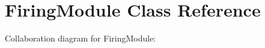 \hypertarget{class_firing_module}{}\section{Firing\+Module Class Reference}
\label{class_firing_module}


Collaboration diagram for Firing\+Module\+:
